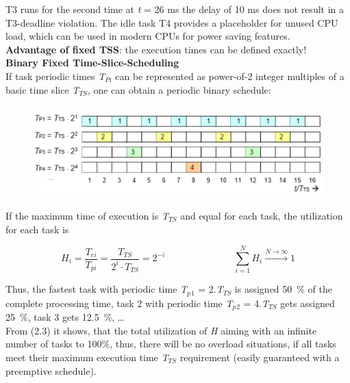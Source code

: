 T3 runs for the second time at \textit{t} = 26 ms the delay of 10 ms does not result in a T3-deadline violation. The idle task T4 provides a placeholder for unused CPU load, which can be used in modern CPUs for power saving features.\\

\textbf{Advantage of fixed TSS}: the execution times can be defined exactly!\\

{\rot\bf Binary Fixed Time-Slice-Scheduling }\\

If task periodic times \textit{T${}_{Pi}$} can be represented as power-of-2 integer multiples of a basic time slice \textit{T${}_{TS}$}, one can obtain a periodic binary schedule:\\

	\begin{figure}[h]
    \centering
    \includegraphics[width=12cm, height=3.5cm]{Images/image94.png}
    \label{fig:Fig 39}
    \end{figure}

If the maximum time of execution is \textit{T}${}_{TS}$ and equal for each task, the utilization for each task is 

\begin{equation}
	 H_{i} =\frac{T_{ei} }{T_{pi} } =\frac{T_{TS} }{2^{i} \cdot T_{TS} } =2^{-i} \hspace{3cm} \sum_{i=1}^N H_{i} \stackrel{N\to \infty }{\longrightarrow} 1
\label{EQ }
\end{equation}

Thus, the fastest task with periodic time \textit{T${}_{p}$}${}_{1}$ = 2$.$\textit{T}${}_{TS}$ is assigned 50~\% of the complete processing time, task 2 with periodic time \textit{T${}_{p}$}${}_{2}$ = 4$.$\textit{T}${}_{TS}$ gets assigned 25~\%, task 3 gets 12.5~\%, {\dots}\\

From (2.3) it shows, that the total utilization of \textit{H} aiming with an infinite number of tasks to 100\%, thus, there will be no overload situations, if all tasks meet their maximum execution time \textit{T${}_{TS}$} requirement (easily guaranteed with a preemptive schedule).\\

